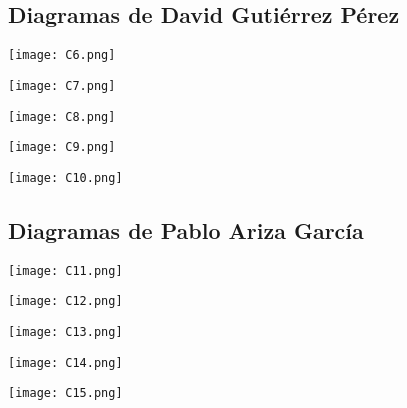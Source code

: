 \documentclass[12pt, spanish]{article}
\begin{document}
\pagebreak

\subsection{Diagramas de David Gutiérrez Pérez}
\begin{centering}\texttt{[image: C6.png]}\\[1.0 cm]\end{centering}
\begin{centering}\texttt{[image: C7.png]}\\[1.0 cm]\end{centering}
\begin{centering}\texttt{[image: C8.png]}\\[1.0 cm]\end{centering}
\begin{centering}\texttt{[image: C9.png]}\\[1.0 cm]\end{centering}
\begin{centering}\texttt{[image: C10.png]}\\[1.0 cm]\end{centering}

\pagebreak

\subsection{Diagramas de Pablo Ariza García}
\begin{centering}\texttt{[image: C11.png]}\\[1.0 cm]\end{centering}
\begin{centering}\texttt{[image: C12.png]}\\[1.0 cm]\end{centering}
\begin{centering}\texttt{[image: C13.png]}\\[1.0 cm]\end{centering}
\begin{centering}\texttt{[image: C14.png]}\\[1.0 cm]\end{centering}
\begin{centering}\texttt{[image: C15.png]}\\[1.0 cm]\end{centering}
\end{document}
